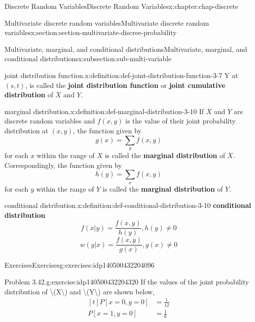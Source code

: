 \documentclass[oneside,10pt,]{book}
\newcommand{\terminology}[1]{\textbf{#1}}
\newcommand{\amp}{&}
\begin{document}
\begin{chapterptx}{Discrete Random Variables}{}{Discrete Random Variables}{}{}{x:chapter:chap-discrete}
\begin{sectionptx}{Multivariate discrete random variables}{}{Multivariate discrete random variables}{}{}{x:section:section-multivariate-discree-probability}
\begin{subsectionptx}{Multivariate, marginal, and conditional distributions}{}{Multivariate, marginal, and conditional distributions}{}{}{x:subsection:sub-multi-variable}
\begin{definition}{joint distribution function.}{x:definition:def-joint-distribution-function-3-7}
Y\) at \(\displaystyle (s, t)\), is called the \terminology{joint distribution function} or \terminology{joint cumulative distribution} of \(\displaystyle X\) and \(\displaystyle
Y\).%
\end{definition}
\begin{definition}{marginal distribution.}{x:definition:def-marginal-distribution-3-10}%
If \(\displaystyle X\) and \(\displaystyle Y\) are discrete random variables and \(\displaystyle f(x, y)\) is the value of their joint probability distribution at \(\displaystyle (x, y)\), the function given by%
\begin{equation*}
g(x) = \sum_y f(x, y)
\end{equation*}
for each \(\displaystyle x\) within the range of \(\displaystyle X\) is called the \terminology{marginal distribution} of \(\displaystyle X\). Correspondingly, the function given by%
\begin{equation*}
h(y) = \sum_x f(x, y)
\end{equation*}
for each \(\displaystyle y\) within the range of \(\displaystyle Y\) is called the \terminology{marginal distribution} of \(\displaystyle Y\).%
\end{definition}
\begin{definition}{conditional distribution.}{x:definition:def-conditional-distribution-3-10}%
\terminology{conditional distribution}%
\begin{equation*}
f(x|y) = \dfrac{f(x, y)}{h(y)}, h(y)\ne 0
\end{equation*}
%
\begin{equation*}
w(y|x) = \dfrac{f(x, y)}{g(x)}, g(x)\ne 0
\end{equation*}
%
\end{definition}
\end{subsectionptx}
%
%
\typeout{************************************************}
\typeout{************************************************}
%
\begin{exercises-subsection}{Exercises}{}{Exercises}{}{}{g:exercises:idp140500432204096}
\begin{divisionexercise}{1}{Problem 3.42.}{}{g:exercise:idp140500432204320}%
If the values of the joint probability distribution of \textbackslash{}(X\textbackslash{}) and \textbackslash{}(Y\textbackslash{}) are shown below,%
\begin{equation*}
\begin{aligned}[t]
P[x=0, y=0] \amp = \frac{1}{12}\\
P[x=1, y=0] \amp = \frac{1}{6}\\

\end{aligned}
\end{equation*}
\end{divisionexercise}
\end{exercises-subsection}
\end{sectionptx}
\end{chapterptx}
\end{document}

